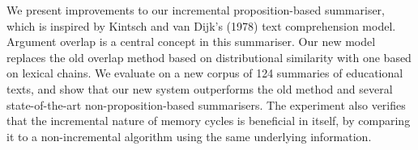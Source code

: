 We present improvements to our incremental proposition-based summariser, which is inspired by Kintsch and van Dijk's (1978) text comprehension model. Argument overlap is a central concept in this summariser. Our new model replaces the old overlap method based on distributional similarity with one based on lexical chains. We evaluate on a new corpus of 124 summaries of educational texts, and show that our new system outperforms the old method and several state-of-the-art non-proposition-based summarisers. The experiment also verifies that the incremental nature of memory cycles is beneficial in itself, by comparing it to a non-incremental algorithm using the same underlying information.
